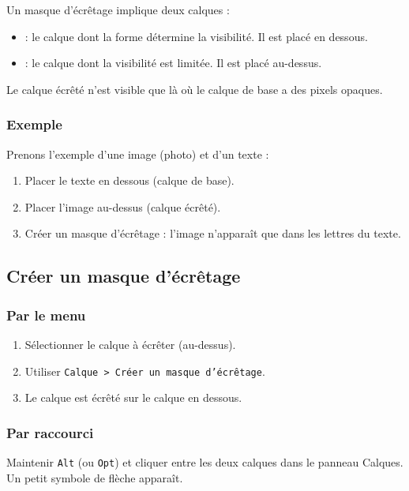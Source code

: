 Un masque d'écrêtage implique deux calques :

\begin{itemize}
    \item {} : le calque dont la forme détermine la visibilité. Il est placé en dessous.
    \item {} : le calque dont la visibilité est limitée. Il est placé au-dessus.
\end{itemize}

Le calque écrêté n'est visible que là où le calque de base a des pixels opaques.

\subsubsection{Exemple}

Prenons l'exemple d'une image (photo) et d'un texte :

\begin{enumerate}
    \item Placer le texte en dessous (calque de base).
    \item Placer l'image au-dessus (calque écrêté).
    \item Créer un masque d'écrêtage : l'image n'apparaît que dans les lettres du texte.
\end{enumerate}

\subsection{Créer un masque d'écrêtage}

\subsubsection{Par le menu}

\begin{enumerate}
    \item Sélectionner le calque à écrêter (au-dessus).
    \item Utiliser \texttt{Calque > Créer un masque d'écrêtage}.
    \item Le calque est écrêté sur le calque en dessous.
\end{enumerate}

\subsubsection{Par raccourci}

Maintenir \texttt{Alt} (ou \texttt{Opt}) et cliquer entre les deux calques dans le panneau Calques. Un petit symbole de flèche apparaît.


